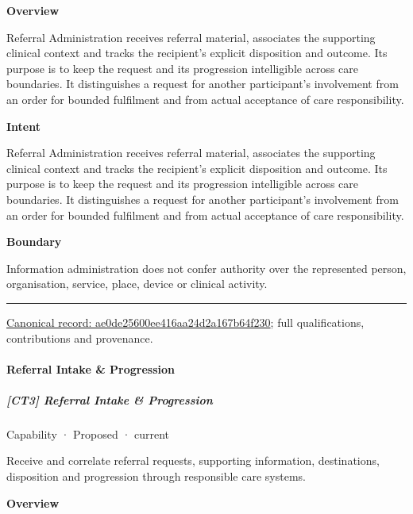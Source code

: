 \textbf{Overview}



Referral Administration receives referral material, associates the supporting clinical context and tracks the recipient's explicit disposition and outcome. Its purpose is to keep the request and its progression intelligible across care boundaries. It distinguishes a request for another participant's involvement from an order for bounded fulfilment and from actual acceptance of care responsibility.



\textbf{Intent}



Referral Administration receives referral material, associates the supporting clinical context and tracks the recipient's explicit disposition and outcome. Its purpose is to keep the request and its progression intelligible across care boundaries. It distinguishes a request for another participant's involvement from an order for bounded fulfilment and from actual acceptance of care responsibility.



\textbf{Boundary}



Information administration does not confer authority over the represented person, organisation, service, place, device or clinical activity.



\medskip\hrule\medskip

{\footnotesize \href{../../../../continuum/strategy/capability/ae0de25600ee416aa24d2a167b64f230.md}{Canonical record: ae0de25600ee416aa24d2a167b64f230}; full qualifications, contributions and provenance.}\par
\paragraph{Referral Intake \& Progression}

\subparagraph{[CT3] Referral Intake \& Progression}

\label{element:d11bdb9464b2476894aa372ab9b929a7}
{\small Capability · Proposed · current}\par

Receive and correlate referral requests, supporting information, destinations, disposition and progression through responsible care systems.



\textbf{Overview}



